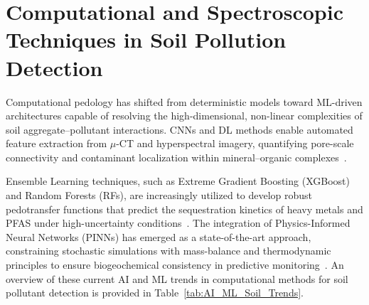 \documentclass[environremediat,article,accept,pdftex,oneauthor]{Definitions/mdpi}
\begin{document}
\section{Computational and Spectroscopic Techniques in \linebreak Soil Pollution
    Detection}\label{sec3}

{Computational pedology has shifted from deterministic models toward ML-driven architectures capable of resolving the high-dimensional, non-linear complexities of soil aggregate--pollutant interactions. CNNs and DL methods enable automated feature extraction from $\mu$-CT and hyperspectral imagery, quantifying pore-scale connectivity and contaminant localization within mineral--organic complexes~\cite{Demiral2026}.}

Ensemble Learning techniques, such as Extreme Gradient Boosting (XGBoost) and
Random Forests (RFs), are increasingly utilized to develop robust pedotransfer
functions that predict the sequestration kinetics of heavy metals and PFAS
under high-uncertainty conditions~\cite{agronomy15030676}. The integration
of Physics-Informed Neural Networks (PINNs) has emerged as a state-of-the-art
approach, constraining stochastic simulations with mass-balance and
thermodynamic principles to ensure biogeochemical consistency in predictive
monitoring~\cite{Xuetall2025}. {An overview of these current AI and ML trends in computational methods for soil pollutant detection is provided in Table~\ref{tab:AI_ML_Soil_Trends}.}
\end{document}
